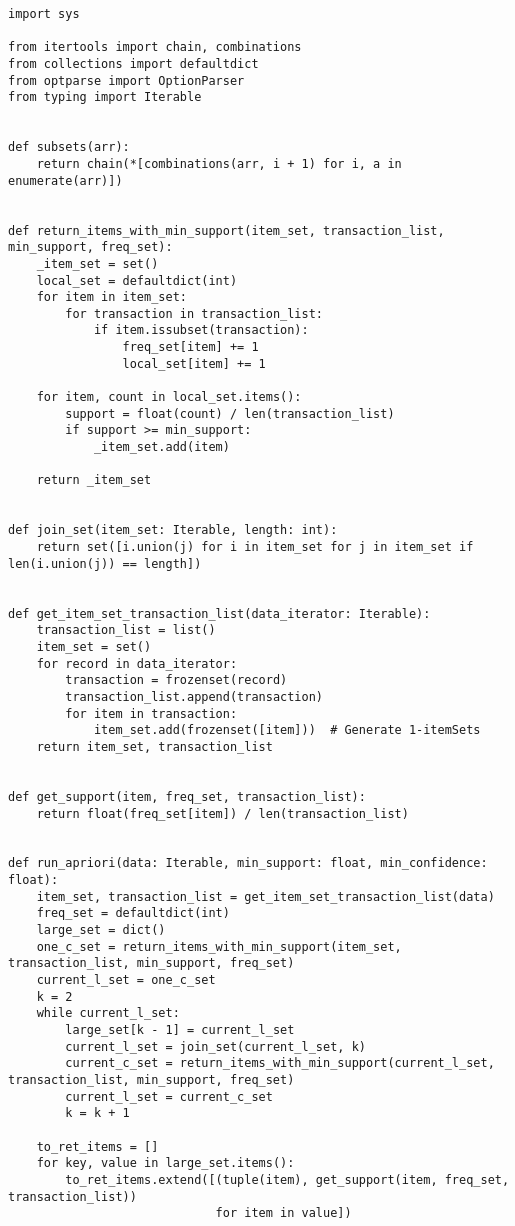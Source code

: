 \documentclass[
]{article}
\begin{document}
\begin{verbatim}
import sys

from itertools import chain, combinations
from collections import defaultdict
from optparse import OptionParser
from typing import Iterable


def subsets(arr):
    return chain(*[combinations(arr, i + 1) for i, a in enumerate(arr)])


def return_items_with_min_support(item_set, transaction_list, min_support, freq_set):
    _item_set = set()
    local_set = defaultdict(int)
    for item in item_set:
        for transaction in transaction_list:
            if item.issubset(transaction):
                freq_set[item] += 1
                local_set[item] += 1

    for item, count in local_set.items():
        support = float(count) / len(transaction_list)
        if support >= min_support:
            _item_set.add(item)

    return _item_set


def join_set(item_set: Iterable, length: int):
    return set([i.union(j) for i in item_set for j in item_set if len(i.union(j)) == length])


def get_item_set_transaction_list(data_iterator: Iterable):
    transaction_list = list()
    item_set = set()
    for record in data_iterator:
        transaction = frozenset(record)
        transaction_list.append(transaction)
        for item in transaction:
            item_set.add(frozenset([item]))  # Generate 1-itemSets
    return item_set, transaction_list


def get_support(item, freq_set, transaction_list):
    return float(freq_set[item]) / len(transaction_list)


def run_apriori(data: Iterable, min_support: float, min_confidence: float):
    item_set, transaction_list = get_item_set_transaction_list(data)
    freq_set = defaultdict(int)
    large_set = dict()
    one_c_set = return_items_with_min_support(item_set, transaction_list, min_support, freq_set)
    current_l_set = one_c_set
    k = 2
    while current_l_set:
        large_set[k - 1] = current_l_set
        current_l_set = join_set(current_l_set, k)
        current_c_set = return_items_with_min_support(current_l_set, transaction_list, min_support, freq_set)
        current_l_set = current_c_set
        k = k + 1

    to_ret_items = []
    for key, value in large_set.items():
        to_ret_items.extend([(tuple(item), get_support(item, freq_set, transaction_list))
                             for item in value])


\end{verbatim}
\end{document}
